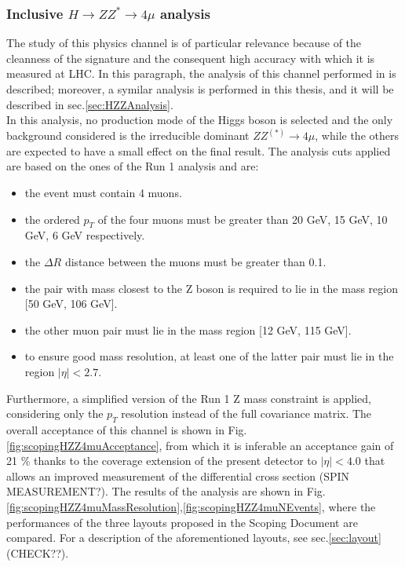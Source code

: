 \documentclass[a4paper,twoside,12pt]{article}
\begin{document}
\subsubsection*{Inclusive $H \rightarrow ZZ^* \rightarrow 4\mu$ analysis}
The study of this physics channel is of particular relevance because of the cleanness of the signature and the consequent high accuracy with which it is measured at LHC. In this paragraph, the analysis of this channel performed in \cite{scoping} is described; moreover, a symilar analysis is performed in this thesis, and it will be described in sec.\ref{sec:HZZAnalysis}.\\

In this analysis, no production mode of the Higgs boson is selected and the only background considered is the irreducible dominant $ZZ^{(*)} \rightarrow 4\mu$, while the others are
expected to have a small effect on the final result. The analysis cuts applied are based on the
ones of the Run 1 analysis and are:

\begin{itemize}
\item the event must contain 4 muons.
\item the ordered $p_T$ of the four muons must be greater than 20 GeV, 15 GeV, 10 GeV, 6 GeV respectively.
\item the $\Delta R$ distance between the muons must be greater than 0.1.
\item the pair with mass closest to the Z boson is required to lie in the mass region [50 GeV, 106 GeV].
\item the other muon pair must lie in the mass region [12 GeV, 115 GeV].
\item to ensure good mass resolution, at least one of the latter pair must lie in the
region $|\eta| < 2.7$. 
\end{itemize}

Furthermore, a simplified version of the Run 1 Z mass constraint is applied, considering only 
the $p_T$ resolution instead of the full covariance matrix. The overall acceptance of this channel is shown in Fig.\ref{fig:scopingHZZ4muAcceptance}, from which it is inferable an 
acceptance gain of 21 \% thanks to the coverage extension of the present detector to 
$|\eta| < 4.0$ that allows an improved measurement of the differential cross section (SPIN MEASUREMENT?). The results of the analysis are shown in Fig.\ref{fig:scopingHZZ4muMassResolution},\ref{fig:scopingHZZ4muNEvents}, where the 
performances of the three layouts proposed in the Scoping Document are compared. For a description of the aforementioned layouts, see sec.\ref{sec:layout} (CHECK??).
\end{document}
